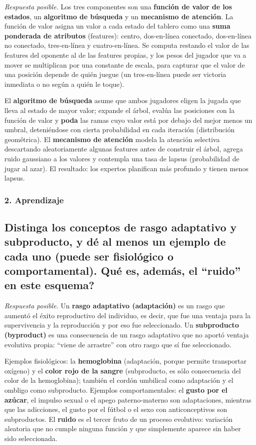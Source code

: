 \documentclass[11pt, a4paper]{article}
\newcommand{\pregunta}[1]{\subsection{#1}}
\newcommand{\eje}[1]{\subsubsection{#1}}
\begin{document}
\begin{respuesta}
\textit{Respuesta posible.} Los tres componentes son una \textbf{funci\'on de valor de los estados}, un \textbf{algoritmo de b\'usqueda} y un \textbf{mecanismo de atenci\'on}. La funci\'on de valor asigna un valor a cada estado del tablero como una \textbf{suma ponderada de atributos} (features): centro, dos-en-l\'inea conectado, dos-en-l\'inea no conectado, tres-en-l\'inea y cuatro-en-l\'inea. Se computa restando el valor de las features del oponente al de las features propias, y los pesos del jugador que va a mover se multiplican por una constante de escala, para capturar que el valor de una posici\'on depende de qui\'en juegue (un tres-en-l\'inea puede ser victoria inmediata o no seg\'un a qui\'en le toque).

El \textbf{algoritmo de b\'usqueda} asume que ambos jugadores eligen la jugada que lleva al estado de mayor valor; expande el \'arbol, eval\'ua las posiciones con la funci\'on de valor y \textbf{poda} las ramas cuyo valor est\'a por debajo del mejor menos un umbral, deteni\'endose con cierta probabilidad en cada iteraci\'on (distribuci\'on geom\'etrica). El \textbf{mecanismo de atenci\'on} modela la atenci\'on selectiva descartando aleatoriamente algunas features antes de construir el \'arbol, agrega ruido gaussiano a los valores y contempla una tasa de lapsus (probabilidad de jugar al azar). El resultado: los expertos planifican m\'as profundo y tienen menos lapsus.
\end{respuesta}

\eje{2. Aprendizaje}
\pregunta{Distinga los conceptos de \textbf{rasgo adaptativo} y \textbf{subproducto}, y d\'e al menos un ejemplo de cada uno (puede ser fisiol\'ogico o comportamental). \textquestiondown Qu\'e es, adem\'as, el ``ruido'' en este esquema?}

\begin{respuesta}
\textit{Respuesta posible.} Un \textbf{rasgo adaptativo (adaptaci\'on)} es un rasgo que aument\'o el \'exito reproductivo del individuo, es decir, que fue una ventaja para la supervivencia y la reproducci\'on y por eso fue seleccionado. Un \textbf{subproducto (byproduct)} es una consecuencia de un rasgo adaptativo que no aport\'o ventaja evolutiva propia: ``viene de arrastre'' con otro rasgo que s\'i fue seleccionado.

Ejemplos fisiol\'ogicos: la \textbf{hemoglobina} (adaptaci\'on, porque permite transportar ox\'igeno) y el \textbf{color rojo de la sangre} (subproducto, es s\'olo consecuencia del color de la hemoglobina); tambi\'en el cord\'on umbilical como adaptaci\'on y el ombligo como subproducto. Ejemplos comportamentales: el \textbf{gusto por el az\'ucar}, el impulso sexual o el apego paterno-materno son adaptaciones, mientras que las adicciones, el gusto por el f\'utbol o el sexo con anticonceptivos son subproductos. El \textbf{ruido} es el tercer fruto de un proceso evolutivo: variaci\'on aleatoria que no cumple ninguna funci\'on y que simplemente aparece sin haber sido seleccionada.
\end{respuesta}
\end{document}
